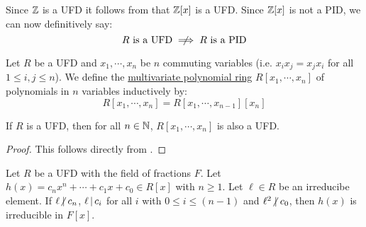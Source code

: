 \documentclass[11pt]{article}
\begin{document}
\begin{example}
    Since $\mathbb{Z}$ is a UFD it follows from  that $\mathbb{Z}[x]$ is a UFD. Since $\mathbb{Z}[x]$ is not a PID, we can now definitively say:
    \[\text{$R$ is a UFD}\centernot\implies\text{$R$ is a PID}\]
\end{example}

\begin{definition}
    Let $R$ be a UFD and $x_1,\cdots,x_n$ be $n$ commuting variables (i.e. $x_ix_j=x_jx_i$ for all $1\leq i,j\leq n$). We define the \ul{multivariate polynomial ring} $R[x_1,\cdots,x_n]$ of polynomials in $n$ variables inductively by:
    \[R[x_1,\cdots,x_n]=R[x_1,\cdots,x_{n-1}][x_n]\]
\end{definition}

\begin{corollary}
    If $R$ is a UFD, then for all $n\in\mathbb{N}$, $R[x_1,\cdots,x_n]$ is also a UFD.
\end{corollary}

\begin{proof}
    This follows directly from .
    
\end{proof}

\begin{theorem}
    Let $R$ be a UFD with the field of fractions $F$. Let $h(x)=c_nx^n+\cdots+c_1x+c_0\in R[x]$ with $n\geq 1$. Let $\ell\in R$ be an irreducibe element. If $\ell\nd c_n$, $\ell\,|\, c_i$ for all $i$ with $0\leq i\leq (n-1)$ and $\ell^2\nd c_0$, then $h(x)$ is irreducible in $F[x]$.
\end{theorem}
\end{document}
